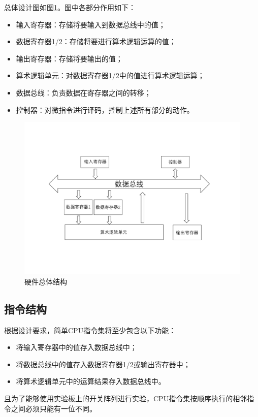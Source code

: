 \documentclass[a4paper]{ctexart}
\begin{document}
\begin{spacing}{1.3}
	总体设计图如图\ref{fig:总体结构图}。图中各部分作用如下：
	\begin{itemize}
		\item 输入寄存器：存储将要输入到数据总线中的值；
		\item 数据寄存器1/2：存储将要进行算术逻辑运算的值；
		\item 输出寄存器：存储将要输出的值；
		\item 算术逻辑单元：对数据寄存器1/2中的值进行算术逻辑运算；
		\item 数据总线：负责数据在寄存器之间的转移；
		\item 控制器：对微指令进行译码，控制上述所有部分的动作。
	\end{itemize}
	\begin{figure}[htbp]
		\centering
		\includegraphics[width=\textwidth]{figure/all.pdf}
		\caption{硬件总体结构}\label{fig:总体结构图}
	\end{figure}

	\subsection{指令结构}
	根据设计要求，简单CPU指令集将至少包含以下功能：
	\begin{itemize}
		\item 将输入寄存器中的值存入数据总线中；
		\item 将数据总线中的值存入数据寄存器1/2或输出寄存器中；
		\item 将算术逻辑单元中的运算结果存入数据总线中。
	\end{itemize}

	且为了能够使用实验板上的开关阵列进行实验，CPU指令集按顺序执行的相邻指令之间必须只能有一位不同。


\end{spacing}
\end{document}
